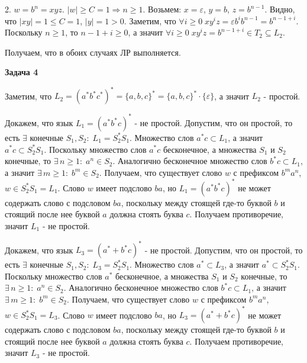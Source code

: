\documentclass[10pt]{article}
\let \eps \varepsilon
\begin{document}
2. $w = b^n = xyz$. $|w| \geq C = 1 \Rightarrow n \geq 1$. Возьмем: $x = \eps$, $y = b$, $z = b^{n - 1}$. Видно, что $|xy| = 1 \leq C = 1$, $|y| = 1 > 0$. Заметим, что $\forall i \geq 0 \; x y^{i} z = \eps b^i b^{n - 1} = b^{n - 1 + i}$. Поскольку $n \geq 1$, то $n - 1 + i \geq 0$, а значит $\forall i \geq 0 \; x y^{i} z = b^{n - 1 + i} \in T_2 \subseteq L_2$.

Получаем, что в обоих случаях ЛР выполняется.

\medskip

{\bf Задача 4}

Заметим, что $L_2 = (a^* b^* c^*)^* = \{ a, b, c \}^* = \{ a, b, c \}^* \cdot \{ \eps \}$, а значит $L_2$ - простой.

Докажем, что язык $L_1 = (a^* b^* c)^*$ - не простой. Допустим, что он простой, то есть $\exists$ конечные $S_1, S_2: \; L_1 = S_2^* S_1$. Множество слов $a^* c \subset L_1$, а значит $a^* c \subset S_2^* S_1$. Поскольку множество слов $a^* c$ бесконечное, а множества $S_1$ и $S_2$ конечные, то $\exists \, n \geq 1: \; a^n \in S_2$. Аналогично бесконечное множество слов $b^*c \subset L_1$, а значит $\exists \, m \geq 1: \; b^m \in S_2$. Получаем, что существует слово $w$ с префиксом $b^m a^n$, $w \in S_2^* S_1 = L_1$. Слово $w$ имеет подслово $ba$, но $L_1 = (a^* b^* c)^*$ не может содержать слово с подсловом $ba$, поскольку между стоящей где-то буквой $b$ и стоящий после нее буквой $a$ должна стоять буква $c$. Получаем противоречие, значит $L_1$ - не простой.

Докажем, что язык $L_3 = (a^* + b^* c)^*$ - не простой. Допустим, что он простой, то есть $\exists$ конечные $S_1, S_2: \; L_3 = S_2^* S_1$. Множество слов $a^* \subset L_3$, а значит $a^* \subset S_2^* S_1$. Поскольку множество слов $a^*$ бесконечное, а множества $S_1$ и $S_2$ конечные, то $\exists \, n \geq 1: \; a^n \in S_2$. Аналогично бесконечное множество слов $b^*c \subset L_1$, а значит $\exists \, m \geq 1: \; b^m \in S_2$. Получаем, что существует слово $w$ с префиксом $b^m a^n$, $w \in S_2^* S_1 = L_3$. Слово $w$ имеет подслово $ba$, но $L_3 = (a^* + b^* c)^*$ не может содержать слово с подсловом $ba$, поскольку между стоящей где-то буквой $b$ и стоящий после нее буквой $a$ должна стоять буква $c$. Получаем противоречие, значит $L_3$ - не простой.
\end{document}
